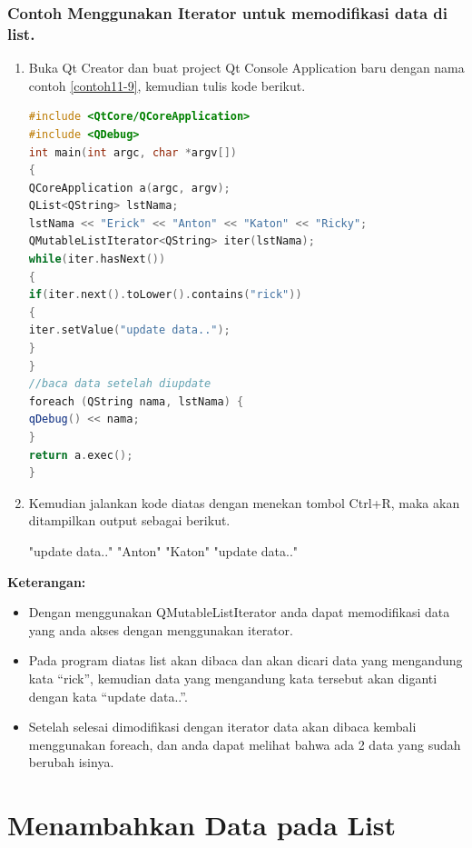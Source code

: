 \subsubsection*{Contoh  Menggunakan Iterator untuk memodifikasi data di list.}

\begin{enumerate}

\item
  Buka Qt Creator dan buat project Qt Console Application baru dengan
  nama contoh \ref{contoh11-9}, kemudian tulis kode berikut.

\begin{lstlisting}[language=c++, caption= Menggunakan Iterator untuk memodifikasi data di list, label=contoh11-9]
#include <QtCore/QCoreApplication>
#include <QDebug>
int main(int argc, char *argv[])
{
QCoreApplication a(argc, argv);
QList<QString> lstNama;
lstNama << "Erick" << "Anton" << "Katon" << "Ricky";
QMutableListIterator<QString> iter(lstNama);
while(iter.hasNext())
{
if(iter.next().toLower().contains("rick"))
{
iter.setValue("update data..");
}
}
//baca data setelah diupdate
foreach (QString nama, lstNama) {
qDebug() << nama;
}
return a.exec();
}
\end{lstlisting}
\item
  Kemudian jalankan kode diatas dengan menekan tombol Ctrl+R, maka akan
  ditampilkan output sebagai berikut.

\begin{lcverbatim}
"update data.."
"Anton"
"Katon"
"update data.."
\end{lcverbatim}
\end{enumerate}

\textbf{Keterangan:}

\begin{itemize}

\item
  Dengan menggunakan QMutableListIterator anda dapat memodifikasi data
  yang anda akses dengan menggunakan iterator.
\item
  Pada program diatas list akan dibaca dan akan dicari data yang
  mengandung kata ``rick'', kemudian data yang mengandung kata tersebut
  akan diganti dengan kata ``update data..''.
\item
  Setelah selesai dimodifikasi dengan iterator data akan dibaca kembali
  menggunakan foreach, dan anda dapat melihat bahwa ada 2 data yang
  sudah berubah isinya.
\end{itemize}

\section{Menambahkan Data pada List}\label{menambahkan-data-pada-list}

